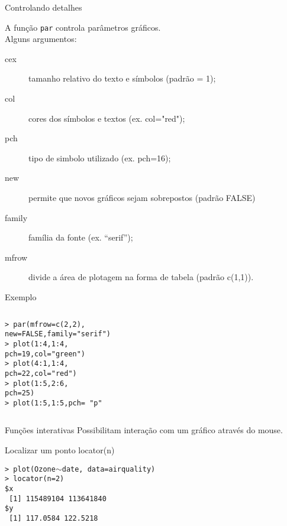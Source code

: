 \documentclass{beamer}
\begin{document}
\begin{frame}{Controlando detalhes}
 
A função \texttt{par} controla parâmetros gráficos. \\ \pause
Alguns argumentos:
\begin{description}
\item[cex] tamanho relativo do texto e símbolos (padrão = 1);
  \item[col] cores dos símbolos e textos (ex. col="red");
\item[pch] tipo de simbolo utilizado (ex. pch=16);
\item[new] permite que novos gráficos sejam sobrepostos (padrão FALSE)
\item[family] família da fonte (ex. ``serif'');
\item[mfrow] divide a área de plotagem  na forma de tabela (padrão c(1,1)).
\end{description}
\end{frame}

\begin{frame}{Exemplo}
 \begin{columns}
    \begin{column}{4cm}
\texttt{\small > par(mfrow=c(2,2),\\ new=FALSE,family="serif")\\ \vspace{10pt}
> plot(1:4,1:4,\\pch=19,col="green")\\ \vspace{10pt}
> plot(4:1,1:4,\\pch=22,col="red")\\ \vspace{10pt}
> plot(1:5,2:6,\\pch=25)\\ \vspace{10pt}
> plot(1:5,1:5,pch= "p"
}
    \end{column}

    \begin{column}{6cm}
    \end{column}
  \end{columns}
  
\end{frame}

\begin{frame}{Funções interativas}
Possibilitam interação com um gráfico através do mouse.

\begin{block}{Localizar um ponto}
locator(n)  
\end{block}
\texttt{> plot(Ozone$\sim$date, data=airquality)\\
> locator(n=2)\\
\$x\\
~[1] 115489104 113641840 \\ \vspace{10pt}
\$y\\
~[1] 117.0584 122.5218}
  \end{frame}
\end{document}
